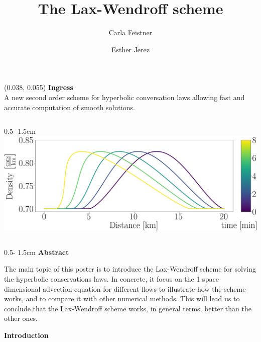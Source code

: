 \documentclass{uibposter}
\title{The Lax-Wendroff scheme}
\author
{%
    Carla Feistner 
    \and
    Esther Jerez
}
\institute
{
    Department of mathematics -- University of Bergen
}
\begin{document}
\begin{textblock}{0.5}(0.038, 0.055)
    \color{white}
    \sffamily
    \textbf{Ingress}
    \\
A new second order scheme for hyperbolic conversation laws allowing fast and accurate computation of smooth solutions. 
\end{textblock}

\begin{frame}[fragile]

\begin{columns}
\begin{column}{0.5\textwidth - 1.5cm}
    \includegraphics[width=\textwidth]{fig/traffic_motivation_laxW_continous.png}
    \vspace{0.5cm}

\begin{column}{0.5\textwidth - 1.5cm}
\textbf{Abstract}
\vspace{0.5cm}

The main topic of this poster is to introduce the Lax-Wendroff scheme for solving the hyperbolic conservations laws. In concrete, it focus on the 1 space dimensional advection equation for different flows to illustrate how the scheme works, and to compare it with other numerical methods. This will lead us to conclude that the Lax-Wendroff scheme works, in general terms, better than the other ones.

\vspace{0.5cm}
\textbf{Introduction}
\vspace{0.5cm}


\end{column}
\end{column}
\end{columns}
\end{frame}
\end{document}
